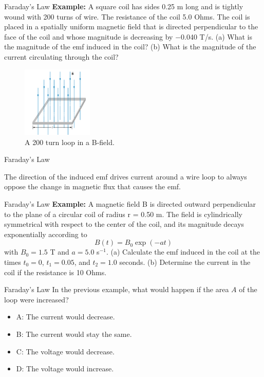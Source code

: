 \documentclass{beamer}
\begin{document}
\begin{frame}{Faraday's Law}
\small
\textbf{Example:}
A square coil has sides 0.25 m long and is tightly wound with 200 turns of wire. The resistance of the coil 5.0 Ohms. The coil is placed in a spatially uniform magnetic field that is directed perpendicular to the face of the coil and whose magnitude is decreasing by −0.040 T/s. (a) What is the magnitude of the emf induced in the coil? (b) What is the magnitude of the current circulating through the coil?
\begin{figure}
\centering
\includegraphics[width=0.3\textwidth]{figures/loop1.png}
\caption{\label{fig:loop1} A 200 turn loop in a B-field.}
\end{figure}
\end{frame}

\begin{frame}{Faraday's Law}
\begin{tcolorbox}[colback=white,colframe=black!40!black,title=Lenz's Law]
\alert{The direction of the induced emf drives current around a wire loop to always oppose the change in magnetic flux that
causes the emf.}
\end{tcolorbox}
\end{frame}

\begin{frame}{Faraday's Law}
\small
\textbf{Example:}
A magnetic field B is directed outward perpendicular to the plane of a circular coil of radius r = 0.50 m.  The field is cylindrically symmetrical with respect to the center of the coil, and its magnitude decays exponentially according to
\begin{equation}
B(t) = B_0 \exp(-a t)
\end{equation}
with $B_0 = 1.5$ T and $a = 5.0$ s$^{-1}$.  (a) Calculate the emf induced in the coil at the times $t_0 = 0$, $t_1 = 0.05$, and $t_2 = 1.0$ seconds. (b) Determine the current in the coil if the resistance is 10 Ohms. 
\end{frame}

\begin{frame}{Faraday's Law}
In the previous example, what would happen if the area $A$ of the loop were increased?
\begin{itemize}
\item A: The current would decrease.
\item B: The current would stay the same.
\item C: The voltage would decrease.
\item D: The voltage would increase.
\end{itemize}
\end{frame}
\end{document}
